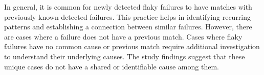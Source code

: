 
 
In general, it is common for newly detected flaky failures to have matches with previously known detected failures. This practice helps in identifying recurring patterns and establishing a connection between similar failures. However, there are cases where a failure does not have a previous match. Cases where flaky failures have no common cause or previous match require additional investigation to understand their underlying causes. The study findings suggest that these unique cases do not have a shared or identifiable cause among them.







